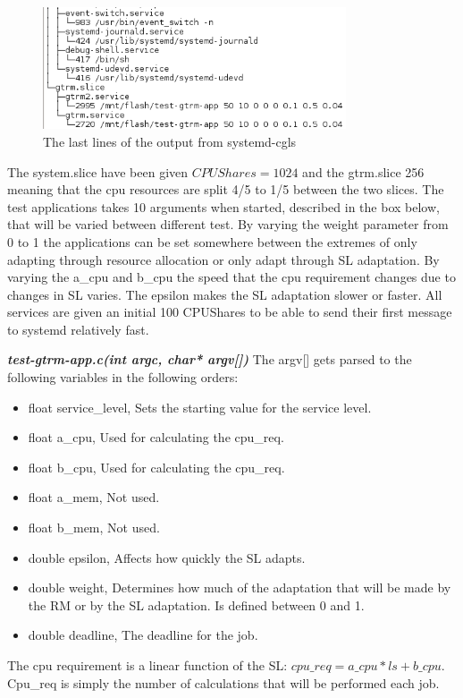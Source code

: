 \documentclass[nobiblatex]{LTHthesis}
\begin{document}
\begin{figure}[h]
    \centering
    \includegraphics[width=0.8\textwidth]{systemd-cgls1}
    \caption{The last lines of the output from systemd-cgls}
    \label{fig:systemd-cgls2}
\end{figure}


The system.slice have been given $CPUShares = 1024$ and the gtrm.slice 256 meaning that the cpu resources are split 4/5 to 1/5 between the two slices. The test applications takes 10 arguments when started, described in the box below, that will be varied between different test. By varying the weight parameter from 0 to 1 the applications can be set somewhere between the extremes of only adapting through resource allocation or only adapt through SL adaptation.
By varying the a\_cpu and b\_cpu the speed that the cpu requirement changes due to changes in SL varies. The epsilon makes the SL adaptation slower or faster. All services are given an initial 100 CPUShares to be able to send their first message to systemd relatively fast.


\begin{framed}
	\begin{flushleft}
		\textbf{\emph{test-gtrm-app.c(int argc, char* argv[])}}
		The argv[] gets parsed to the following variables in the following orders:
		\begin{itemize}
		\item float service\_level, Sets the starting value for the service level.
		\item float a\_cpu, Used for calculating the cpu\_req.
		\item float b\_cpu, Used for calculating the cpu\_req.
		\item float a\_mem, Not used.
		\item float b\_mem, Not used.
		\item double epsilon, Affects how quickly the SL adapts.
		\item double weight, Determines how much of the adaptation that will be made by the RM or by the SL adaptation. Is defined between 0 and 1.
		\item double deadline, The deadline for the job.
		\end{itemize}
		The cpu requirement is a linear function of the SL: $cpu\_req = a\_cpu*ls +b\_cpu  $. Cpu\_req is simply the number of calculations 
		that will be performed each job. 
	\end{flushleft}
\end{framed}	
\end{document}
